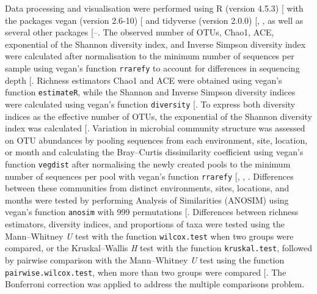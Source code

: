 \documentclass[
  12 pt,
]{article}
\begin{document}
Data processing and visualisation were performed using R (version 4.5.3) {[}\citeproc{ref-R-base}{57}{]} with the packages vegan (version 2.6-10) {[}\citeproc{ref-R-vegan}{58}{]} and tidyverse (version 2.0.0) {[}, \citeproc{ref-tidyverse2019}{60}{]}, as well as several other packages {[}--\citeproc{ref-tinytex2019}{83}{]}. The observed number of OTUs, Chao1, ACE, exponential of the Shannon diversity index, and Inverse Simpson diversity index were calculated after normalisation to the minimum number of sequences per sample using vegan's function \texttt{rrarefy} to account for differences in sequencing depth {[}\citeproc{ref-R-vegan}{58}{]}. Richness estimators Chao1 and ACE were obtained using vegan's function \texttt{estimateR}, while the Shannon and Inverse Simpson diversity indices were calculated using vegan's function \texttt{diversity} {[}\citeproc{ref-R-vegan}{58}{]}. To express both diversity indices as the effective number of OTUs, the exponential of the Shannon diversity index was calculated {[}\citeproc{ref-Jost2006}{84}{]}. Variation in microbial community structure was assessed on OTU abundances by pooling sequences from each environment, site, location, or month and calculating the Bray--Curtis dissimilarity coefficient using vegan's function \texttt{vegdist} after normalising the newly created pools to the minimum number of sequences per pool with vegan's function \texttt{rrarefy} {[}, , \citeproc{ref-Legendre2012}{86}{]}. Differences between these communities from distinct environments, sites, locations, and months were tested by performing Analysis of Similarities (ANOSIM) using vegan's function \texttt{anosim} with 999 permutations {[}\citeproc{ref-R-vegan}{58}{]}. Differences between richness estimators, diversity indices, and proportions of taxa were tested using the Mann--Whitney \emph{U} test with the function \texttt{wilcox.test} when two groups were compared, or the Kruskal--Wallis \emph{H} test with the function \texttt{kruskal.test}, followed by pairwise comparison with the Mann--Whitney \emph{U} test using the function \texttt{pairwise.wilcox.test}, when more than two groups were compared {[}\citeproc{ref-R-base}{57}{]}. The Bonferroni correction was applied to address the multiple comparisons problem.
\end{document}
